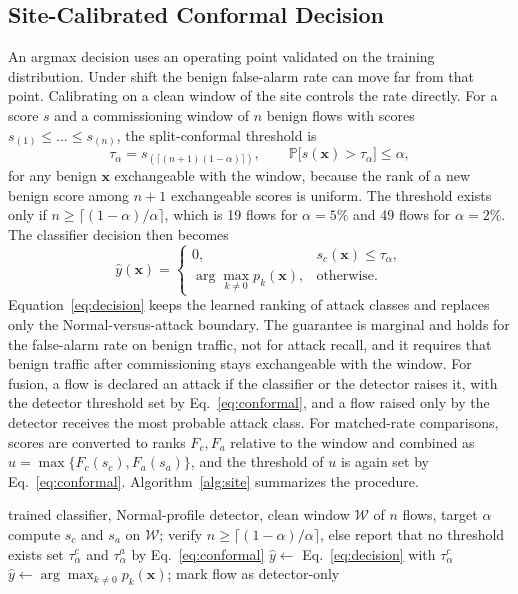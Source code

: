 \documentclass[journal]{IEEEtran}
\newcommand{\Pbb}{\mathbb{P}}
\begin{document}
\subsection{Site-Calibrated Conformal Decision}
An argmax decision uses an operating point validated on the training distribution. Under shift the benign false-alarm rate can move far from that point. Calibrating on a clean window of the site controls the rate directly. For a score $s$ and a commissioning window of $n$ benign flows with scores $s_{(1)}\le\dots\le s_{(n)}$, the split-conformal threshold \cite{vovk2005algorithmic,bates2023testing} is
\begin{equation}
\tau_\alpha=s_{(\lceil (n+1)(1-\alpha)\rceil)},\qquad \Pbb\big[s(\mathbf{x})>\tau_\alpha\big]\le\alpha,
\label{eq:conformal}
\end{equation}
for any benign $\mathbf{x}$ exchangeable with the window, because the rank of a new benign score among $n+1$ exchangeable scores is uniform. The threshold exists only if $n\ge\lceil(1-\alpha)/\alpha\rceil$, which is 19 flows for $\alpha=5\%$ and 49 flows for $\alpha=2\%$. The classifier decision then becomes
\begin{equation}
\hat{y}(\mathbf{x})=\begin{cases}0,& s_c(\mathbf{x})\le\tau_\alpha,\\ \arg\max_{k\ne0}p_k(\mathbf{x}),& \text{otherwise.}\end{cases}
\label{eq:decision}
\end{equation}
Equation~\eqref{eq:decision} keeps the learned ranking of attack classes and replaces only the Normal-versus-attack boundary. The guarantee is marginal and holds for the false-alarm rate on benign traffic, not for attack recall, and it requires that benign traffic after commissioning stays exchangeable with the window. For fusion, a flow is declared an attack if the classifier or the detector raises it, with the detector threshold set by Eq.~\eqref{eq:conformal}, and a flow raised only by the detector receives the most probable attack class. For matched-rate comparisons, scores are converted to ranks $F_c,F_a$ relative to the window and combined as $u=\max\{F_c(s_c),F_a(s_a)\}$, and the threshold of $u$ is again set by Eq.~\eqref{eq:conformal}. Algorithm~\ref{alg:site} summarizes the procedure.

\begin{algorithm}[t]
\caption{Site calibration and decision.}
\label{alg:site}
\begin{algorithmic}[1]
\REQUIRE trained classifier, Normal-profile detector, clean window $\mathcal{W}$ of $n$ flows, target $\alpha$
\STATE compute $s_c$ and $s_a$ on $\mathcal{W}$; verify $n\ge\lceil(1-\alpha)/\alpha\rceil$, else report that no threshold exists
\STATE set $\tau^{c}_\alpha$ and $\tau^{a}_\alpha$ by Eq.~\eqref{eq:conformal}
\STATE $\hat{y}\leftarrow$ Eq.~\eqref{eq:decision} with $\tau^{c}_\alpha$
\STATE $\hat{y}\leftarrow\arg\max_{k\ne0}p_k(\mathbf{x})$; mark flow as detector-only
\ENDIF
\ENDFOR
\end{algorithmic}
\end{algorithm}
\end{document}
